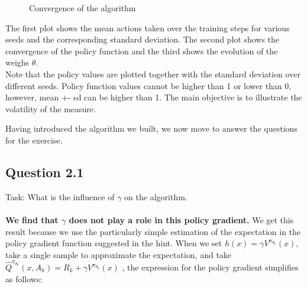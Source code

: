 \documentclass[a4paper, 11pt]{article} %
\begin{document}
   \begin{figure}[!htb]
        \caption{\label{fig:my-label} Convergence of the algorithm}
      \end{figure}
      
The first plot shows the mean actions taken over the training steps for various seeds and the corresponding standard deviation. The second plot shows the convergence of the policy function and the third shows the evolution of the weighs $\theta$. \\

Note that the policy values are plotted together with the standard deviation over different seeds. Policy function values cannot be higher than 1 or lower than 0, however, mean +- sd can be higher than 1. The main objective is to illustrate the volatility of the measure.

Having introduced the algorithm we built, we now move to answer the questions for the exercise.

\subsection*{Question 2.1}

Task: What is the influence of $\gamma$ on the algorithm.
\\
\\
\textbf{We find that $\gamma$ does not play a role in this policy gradient.} We get this result because we use the particularly simple estimation of the expectation in the policy gradient function suggested in the hint. When we set $h(x)=\gamma V^{\pi_{\theta_{k}}}(x)$, take a single sample to approximate the expectation, and take $\widehat{Q}^{\pi_{\theta_{k}}}\left(x, A_{k}\right)=R_{k}+\gamma V^{\pi_{\theta_{k}}}(x)$ , the expression for the policy gradient simplifies as follows:
\end{document}
